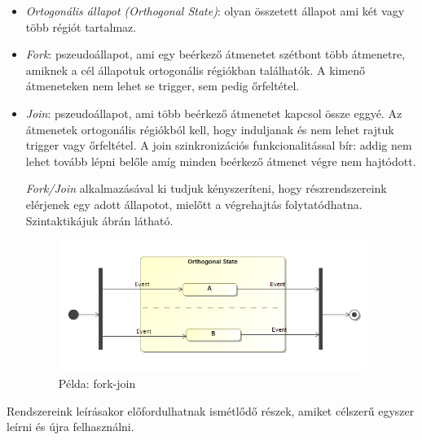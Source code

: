 \begin{itemize}
	\item \emph{Ortogonális állapot (Orthogonal State)}: olyan összetett állapot ami két vagy több régiót tartalmaz.
	\item \emph{Fork}: pszeudoállapot, ami egy beérkező átmenetet szétbont több átmenetre, amiknek a cél állapotuk ortogonális régiókban találhatók. A kimenő átmeneteken nem lehet se trigger, sem pedig őrfeltétel.
	\item \emph{Join}: pszeudoállapot, ami több beérkező átmenetet kapcsol össze eggyé. Az átmenetek ortogonális régiókból kell, hogy induljanak és nem lehet rajtuk trigger vagy őrfeltétel. A join szinkronizációs funkcionalitással bír: addig nem lehet tovább lépni belőle amíg minden beérkező átmenet végre nem hajtódott.
	
	\emph{Fork/Join} alkalmazásával ki tudjuk kényszeríteni, hogy részrendszereink elérjenek egy adott állapotot, mielőtt a végrehajtás folytatódhatna. Szintaktikájuk  ábrán látható. 
	
	\begin{figure}[!ht]
		\centering
		\includegraphics[keepaspectratio, width=100mm]{figures/statechart_elements/forkjoin.png}
		\caption{Példa: fork-join}
		\label{fig:forkjoin}
	\end{figure}
	
\end{itemize}
Rendszereink leírásakor előfordulhatnak ismétlődő részek, amiket célszerű egyszer leírni és újra felhasználni.
